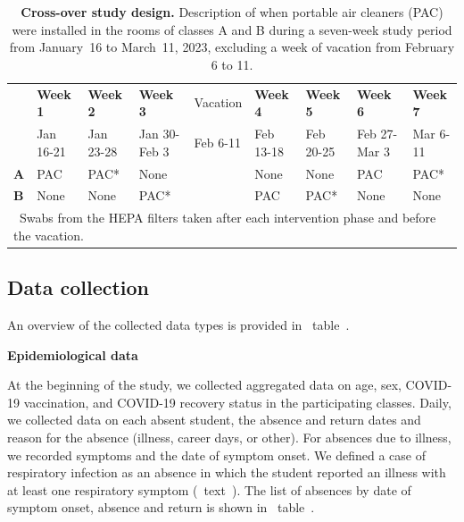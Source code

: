 \documentclass[fleqn,11pt]{wlscirep}
\begin{document}
\begin{table}[!htpb]
    \footnotesize
    \centering
    \caption{\textbf{Cross-over study design.} Description of when portable air cleaners (PAC) were installed in the rooms of classes A and B during a seven-week study period from January~16 to March~11, 2023, excluding a week of vacation from February 6 to 11.}\label{tab:study_design}
    \begin{tabular}{l l l l l l l l l}
    \toprule
      & \textbf{Week 1} & \textbf{Week 2} & \textbf{Week 3} & Vacation & \textbf{Week 4} & \textbf{Week 5} & \textbf{Week 6} & \textbf{Week 7} \\
      & Jan 16-21 & Jan 23-28 & Jan 30-Feb 3 & Feb 6-11 & Feb 13-18 & Feb 20-25 & Feb 27-Mar 3 & Mar 6-11 \\
      \midrule
      \textbf{A} & \cellcolor{gray!50} PAC & \cellcolor{gray!50} PAC\hphantom{000}*& \cellcolor{gray!10} None & & \cellcolor{gray!10} None & \cellcolor{gray!10} None & \cellcolor{gray!50} PAC & \cellcolor{gray!50} PAC\hphantom{0000}* \\
      \textbf{B} & \cellcolor{gray!10} None & \cellcolor{gray!10} None & \cellcolor{gray!50} PAC\hphantom{00000}* & & \cellcolor{gray!50} PAC & \cellcolor{gray!50} PAC\hphantom{000}*& \cellcolor{gray!10} None & \cellcolor{gray!10} None \\
      \bottomrule
      \multicolumn{9}{l}{\scriptsize *~Swabs from the HEPA filters taken after each intervention phase and before the vacation.}
    \end{tabular}
\end{table}
 
\subsection*{Data collection}

An overview of the collected data types is provided in \supp~table~. \medskip

\noindent\textbf{Epidemiological data} \smallskip

\noindent At the beginning of the study, we collected aggregated data on age, sex, COVID-19 vaccination, and COVID-19 recovery status in the participating classes. Daily, we collected data on each absent student, \ie the absence and return dates and reason for the absence (illness, career days, or other). For absences due to illness, we recorded symptoms and the date of symptom onset. We defined a case of respiratory infection as an absence in which the student reported an illness with at least one respiratory symptom (\supp~text~). The list of absences by date of symptom onset, absence and return is shown in \supp~table~. \medskip
\end{document}
